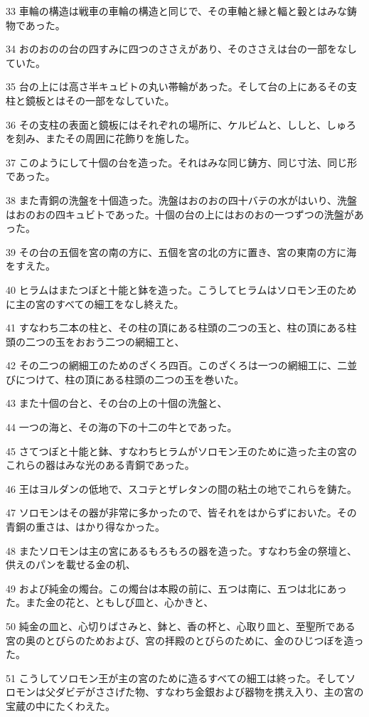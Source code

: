 \par 33 車輪の構造は戦車の車輪の構造と同じで、その車軸と縁と輻と轂とはみな鋳物であった。
\par 34 おのおのの台の四すみに四つのささえがあり、そのささえは台の一部をなしていた。
\par 35 台の上には高さ半キュビトの丸い帯輪があった。そして台の上にあるその支柱と鏡板とはその一部をなしていた。
\par 36 その支柱の表面と鏡板にはそれぞれの場所に、ケルビムと、ししと、しゅろを刻み、またその周囲に花飾りを施した。
\par 37 このようにして十個の台を造った。それはみな同じ鋳方、同じ寸法、同じ形であった。
\par 38 また青銅の洗盤を十個造った。洗盤はおのおの四十バテの水がはいり、洗盤はおのおの四キュビトであった。十個の台の上にはおのおの一つずつの洗盤があった。
\par 39 その台の五個を宮の南の方に、五個を宮の北の方に置き、宮の東南の方に海をすえた。
\par 40 ヒラムはまたつぼと十能と鉢を造った。こうしてヒラムはソロモン王のために主の宮のすべての細工をなし終えた。
\par 41 すなわち二本の柱と、その柱の頂にある柱頭の二つの玉と、柱の頂にある柱頭の二つの玉をおおう二つの網細工と、
\par 42 その二つの網細工のためのざくろ四百。このざくろは一つの網細工に、二並びにつけて、柱の頂にある柱頭の二つの玉を巻いた。
\par 43 また十個の台と、その台の上の十個の洗盤と、
\par 44 一つの海と、その海の下の十二の牛とであった。
\par 45 さてつぼと十能と鉢、すなわちヒラムがソロモン王のために造った主の宮のこれらの器はみな光のある青銅であった。
\par 46 王はヨルダンの低地で、スコテとザレタンの間の粘土の地でこれらを鋳た。
\par 47 ソロモンはその器が非常に多かったので、皆それをはからずにおいた。その青銅の重さは、はかり得なかった。
\par 48 またソロモンは主の宮にあるもろもろの器を造った。すなわち金の祭壇と、供えのパンを載せる金の机、
\par 49 および純金の燭台。この燭台は本殿の前に、五つは南に、五つは北にあった。また金の花と、ともしび皿と、心かきと、
\par 50 純金の皿と、心切りばさみと、鉢と、香の杯と、心取り皿と、至聖所である宮の奥のとびらのためおよび、宮の拝殿のとびらのために、金のひじつぼを造った。
\par 51 こうしてソロモン王が主の宮のために造るすべての細工は終った。そしてソロモンは父ダビデがささげた物、すなわち金銀および器物を携え入り、主の宮の宝蔵の中にたくわえた。

